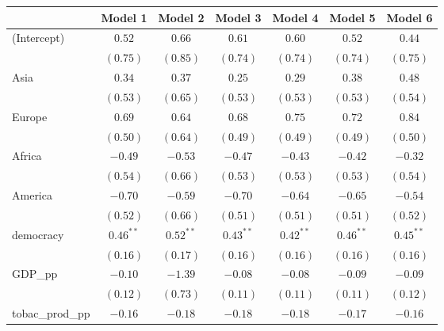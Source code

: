 
\begin{table}[!h]
\begin{center}
\begin{tabular}{l c c c c c c }
\toprule
 & Model 1 & Model 2 & Model 3 & Model 4 & Model 5 & Model 6 \\
\midrule
(Intercept)             & $0.52$       & $0.66$       & $0.61$       & $0.60$       & $0.52$       & $0.44$       \\
                        & $(0.75)$     & $(0.85)$     & $(0.74)$     & $(0.74)$     & $(0.74)$     & $(0.75)$     \\
Asia                    & $0.34$       & $0.37$       & $0.25$       & $0.29$       & $0.38$       & $0.48$       \\
                        & $(0.53)$     & $(0.65)$     & $(0.53)$     & $(0.53)$     & $(0.53)$     & $(0.54)$     \\
Europe                  & $0.69$       & $0.64$       & $0.68$       & $0.75$       & $0.72$       & $0.84$       \\
                        & $(0.50)$     & $(0.64)$     & $(0.49)$     & $(0.49)$     & $(0.49)$     & $(0.50)$     \\
Africa                  & $-0.49$      & $-0.53$      & $-0.47$      & $-0.43$      & $-0.42$      & $-0.32$      \\
                        & $(0.54)$     & $(0.66)$     & $(0.53)$     & $(0.53)$     & $(0.53)$     & $(0.54)$     \\
America                 & $-0.70$      & $-0.59$      & $-0.70$      & $-0.64$      & $-0.65$      & $-0.54$      \\
                        & $(0.52)$     & $(0.66)$     & $(0.51)$     & $(0.51)$     & $(0.51)$     & $(0.52)$     \\
democracy               & $0.46^{**}$  & $0.52^{**}$  & $0.43^{**}$  & $0.42^{**}$  & $0.46^{**}$  & $0.45^{**}$  \\
                        & $(0.16)$     & $(0.17)$     & $(0.16)$     & $(0.16)$     & $(0.16)$     & $(0.16)$     \\
GDP\_pp                 & $-0.10$      & $-1.39$      & $-0.08$      & $-0.08$      & $-0.09$      & $-0.09$      \\
                        & $(0.12)$     & $(0.73)$     & $(0.11)$     & $(0.11)$     & $(0.11)$     & $(0.12)$     \\
tobac\_prod\_pp         & $-0.16$      & $-0.18$      & $-0.18$      & $-0.18$      & $-0.17$      & $-0.16$      \\

\end{tabular}
\end{center}
\end{table}
